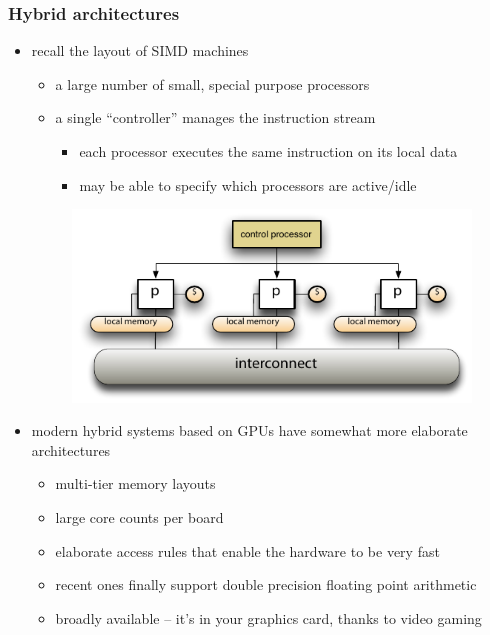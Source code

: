 %
%
%
%


\begin{frame}[fragile]
%
  \frametitle{Hybrid architectures}
%
  \begin{itemize}
%
  \item recall the layout of SIMD machines
    \begin{itemize}
    \item a large number of small, special purpose processors
    \item a single ``controller'' manages the instruction stream
      \begin{itemize}
      \item each processor executes the same instruction on its local data
      \item may be able  to specify which processors are active/idle
      \end{itemize}
    \end{itemize}
    \begin{figure}
      \centering
      \includegraphics[width=.50\linewidth]{figures/simd.pdf}
      \label{fig:simd}
    \end{figure}
%
  \item modern hybrid systems based on GPUs have somewhat more elaborate architectures
    \begin{itemize}
      \item multi-tier memory layouts
      \item large core counts per board
      \item elaborate access rules that enable the hardware to be very fast
      \item recent ones finally support double precision floating point arithmetic
      \item broadly available -- it's in your graphics card, thanks to video gaming
    \end{itemize}
%
  \end{itemize}
%
\end{frame}

